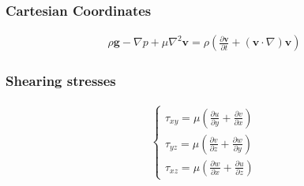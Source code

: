 \documentclass[a4paper]{amsart}
\begin{document}
\subsubsection{Cartesian Coordinates}
\begin{eqnarray*}
	\rho \mathbf{g}-\nabla p+\mu\nabla^2 \mathbf{v}=\rho\left(\frac{\partial \mathbf{v}}{\partial t}+(\mathbf{v}\cdot\nabla)\mathbf{v}\right)
\end{eqnarray*}

\subsubsection{Shearing stresses}
\begin{eqnarray*}
	\begin{cases}
		\tau_{xy}=\mu\left(\frac{\partial u}{\partial y}+\frac{\partial v}{\partial x}\right)\\
		\tau_{yz}=\mu\left(\frac{\partial v}{\partial z}+\frac{\partial w}{\partial y}\right)\\
		\tau_{xz}=\mu\left(\frac{\partial w}{\partial x}+\frac{\partial u}{\partial z}\right)		
	\end{cases}
\end{eqnarray*}
\end{document}
